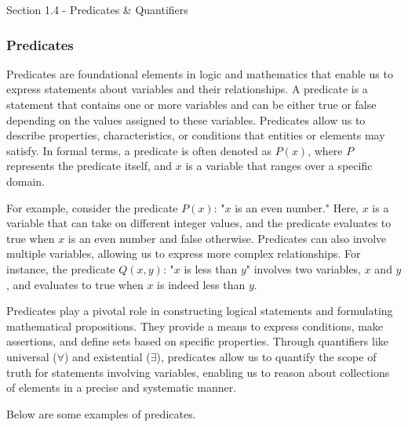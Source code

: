 \begin{notes}{Section 1.4 - Predicates \& Quantifiers}
    \subsubsection*{Predicates}

    Predicates are foundational elements in logic and mathematics that enable us to express statements about variables and their relationships. A predicate is a statement that contains one or more variables and can be either true or false 
    depending on the values assigned to these variables. Predicates allow us to describe properties, characteristics, or conditions that entities or elements may satisfy. In formal terms, a predicate is often denoted as $P(x)$, where $P$ 
    represents the predicate itself, and $x$ is a variable that ranges over a specific domain.
    
    For example, consider the predicate $P(x)$: "$x$ is an even number." Here, $x$ is a variable that can take on different integer values, and the predicate evaluates to true when $x$ is an even number and false otherwise. Predicates can 
    also involve multiple variables, allowing us to express more complex relationships. For instance, the predicate $Q(x, y)$: "$x$ is less than $y$" involves two variables, $x$ and $y$, and evaluates to true when $x$ is indeed less than $y$.
    
    Predicates play a pivotal role in constructing logical statements and formulating mathematical propositions. They provide a means to express conditions, make assertions, and define sets based on specific properties. Through quantifiers 
    like universal ($\forall$) and existential ($\exists$), predicates allow us to quantify the scope of truth for statements involving variables, enabling us to reason about collections of elements in a precise and systematic manner.
    
    \begin{highlight}
        Below are some examples of predicates.


\end{highlight}
\end{notes}
